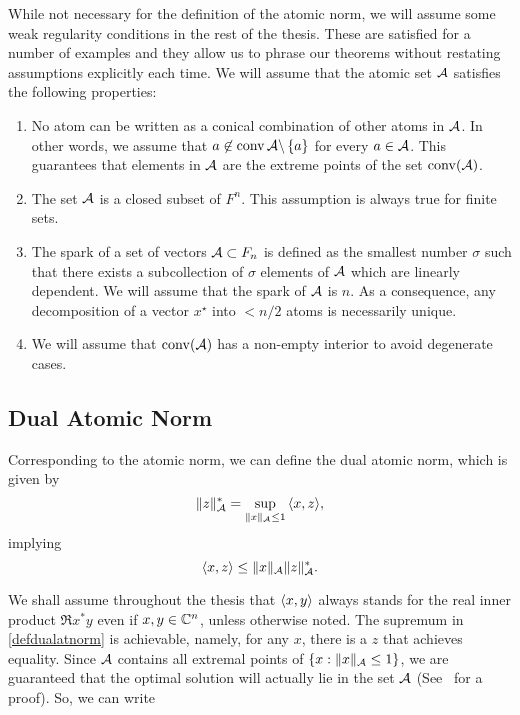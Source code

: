 While not necessary for the definition of the atomic norm, we will assume some
weak regularity conditions in the rest of the thesis. These are satisfied for a
number of examples and they allow us to phrase our theorems without restating
assumptions explicitly each time. We will assume that the atomic set $\mathcal{A}$ satisfies the following properties:
\begin{enumerate}
	\item No atom can be written as a conical combination of other atoms in 		$\mathcal{A}$. In other words, we assume that $ a \not\in \operatorname{conv}{\mathcal{A} \backslash \left\{ a \right\}}$ for every $a \in \mathcal{A}$. This guarantees that elements in $\mathcal{A}$ are the extreme points of the set $\operatorname{conv}(\mathcal{A})$.
	\item The set $\mathcal{A}$ is a closed subset of $F^n$. This assumption is always true for finite sets.
	\item The spark of a set of vectors $\mathcal{A} \subset F_n$ is defined as the smallest number $\sigma$ such that there exists a subcollection of $\sigma$ elements of $\mathcal{A}$ which are linearly dependent. We will assume that the spark of $\mathcal{A}$ is $n$. As a consequence, any decomposition of a vector $x^\star$ into $<n/2$ atoms is necessarily unique.~\cite{spark}
	\item We will assume that $\operatorname{conv}(\mathcal{A})$ has a non-empty interior to avoid degenerate cases.
\end{enumerate}


\subsection{Dual Atomic Norm}

Corresponding to the atomic norm, we can define the dual atomic norm, which is
given by
\begin{equation}
  \label{defdualatnorm}
  \lVert z\rVert_{\mathcal{A}}^* = \sup_{\lVert x\rVert_{\mathcal{A}} \leq 1}{\langle x, z\rangle},
\end{equation}
implying
\begin{equation}
  \label{holder}
  \langle x, z\rangle \leq \lVert x\rVert_{\mathcal{A}} \lVert z\rVert_{\mathcal{A}}^*.
\end{equation}

We shall assume throughout the thesis that $\langle x, y\rangle$ always stands for the
real inner product $\Re{x^* y}$ even if $x,y \in \mathbb{C}^n$, unless otherwise noted.
The supremum in \eqref{defdualatnorm} is achievable, namely, for any $x$, there
is a $z$ that achieves equality. Since $\mathcal{A}$ contains all extremal points of
$\{x: \|x\|_{\mathcal{A}} \leq 1\}$, we are guaranteed that the optimal solution will
actually lie in the set $\mathcal{A}$ (See~\cite{bonsall} for a proof). So, we can write


